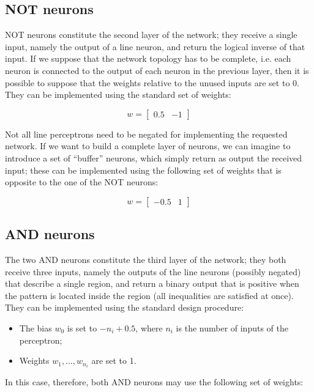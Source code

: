 \documentclass[letterpaper,headings=standardclasses]{scrartcl}
\begin{document}
\subsection{NOT neurons}

NOT neurons constitute the second layer of the network; they receive a single input, namely the output of a line neuron, and return the logical inverse of that input. If we suppose that the network topology has to be complete, i.e. each neuron is connected to the output of each neuron in the previous layer, then it is possible to suppose that the weights relative to the unused inputs are set to 0. They can be implemented using the standard set of weights:

$$ w = [\begin{matrix} 0.5 & -1 \end{matrix}] $$

Not all line perceptrons need to be negated for implementing the requested network. If we want to build a complete layer of neurons, we can imagine to introduce a set of “buffer” neurons, which simply return as output the received input; these can be implemented using the following set of weights that is opposite to the one of the NOT neurons:

$$ w = [\begin{matrix} -0.5 & 1 \end{matrix}] $$

\subsection{AND neurons}

The two AND neurons constitute the third layer of the network; they both receive three inputs, namely the outputs of the line neurons (possibly negated) that describe a single region, and return a binary output that is positive when the pattern is located inside the region (all inequalities are satisfied at once). They can be implemented using the standard design procedure:

\begin{itemize}

\item The bias $w_0$ is set to $-n_i+0.5$, where $n_i$ is the number of inputs of the perceptron;

\item Weights $w_1,\dots,w_{n_i}$ are set to 1.

\end{itemize}

In this case, therefore, both AND neurons may use the following set of weights:
\end{document}
